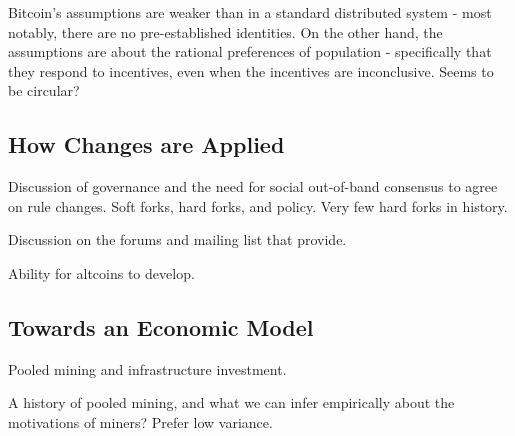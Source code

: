 Bitcoin's assumptions are weaker than in a standard distributed system - most notably, there are no pre-established identities. On the other hand, the assumptions are about the rational preferences of population - specifically that they respond to incentives, even when the incentives are inconclusive. Seems to be circular?


\subsection{How Changes are Applied}

Discussion of governance and the need for social out-of-band consensus to agree on rule changes. Soft forks, hard forks, and policy. Very few hard forks in history.

Discussion on the forums and mailing list that provide.

Ability for altcoins to develop.


\subsection{Towards an Economic Model}

Pooled mining and infrastructure investment.

A history of pooled mining, and what we can infer empirically about the motivations of miners? Prefer low variance.
